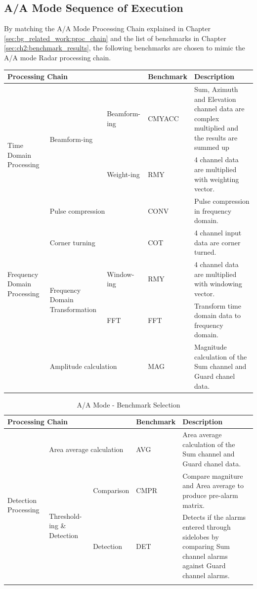 \subsection{A/A Mode Sequence of Execution}
By matching the A/A Mode Processing Chain explained in Chapter \ref{sec:bg_related_work:proc_chain} and the list of benchmarks in Chapter \ref{sec:ch2:benchmark_results}, the following benchmarks are chosen to mimic the A/A mode Radar processing chain.

\begin{longtable}{|p{1.6cm}|p{1.9cm}|p{1.7cm}|p{1.9cm}|p{6cm}|} 
	 \hline
	\multicolumn{3}{|l|}{\textbf{Processing Chain}} & \textbf{Benchmark} & \textbf{Description} \\ \hline
	 \multirow{3}{*}{\parbox{1.7cm}{Time Domain Processing}} & \multirow{2}{*}{\parbox{1.5cm}{Beamform-ing}} & Beamform-ing & CMYACC & Sum, Azimuth and Elevation channel data are complex multiplied and the results are summed up \\ \cline{3-5}
	 & & Weight-ing & RMY & 4 channel data are multiplied with weighting vector. \\ \cline{2-5}
	& \multicolumn{2}{|l|}{Pulse compression} & CONV & Pulse compression in frequency domain. \\ \hline
	
	\multirow{3}{*}{\parbox{1.7cm}{Frequency Domain Processing}} & \multicolumn{2}{|l|}{Corner turning} & COT & 4 channel input data are corner turned. \\ \cline{2-5}
	& \multirow{2}{*}{\parbox{1.7cm}{Frequency Domain Transformation}} & Window-ing & RMY & 4 channel data are multiplied with windowing vector. \\ \cline{3-5}
	& & FFT & FFT & Transform time domain data to frequency domain. \\ \cline{2-5}
	& \multicolumn{2}{|l|}{Amplitude calculation} & MAG & Magnitude calculation of the Sum channel and Guard chanel data. \\ \hline
\end{longtable}
\clearpage
\begin{longtable}{|p{1.6cm}|p{1.9cm}|p{1.7cm}|p{1.9cm}|p{6cm}|} 
	 \hline
	\multicolumn{3}{|l|}{\textbf{Processing Chain}} & \textbf{Benchmark} & \textbf{Description} \\ \hline
	\multirow{3}{*}{\parbox{1.7cm}{Detection Processing}} & \multicolumn{2}{|l|}{Area average calculation} & AVG & Area average calculation of the  Sum channel and Guard chanel data. \\ \cline{2-5}
	& \multirow{2}{*}{\parbox{1.7cm}{Threshold-ing \& Detection}} & Comparison & CMPR & Compare magniture and Area average to produce pre-alarm matrix. \\ \cline{2-5}
	& & Detection & DET & Detects if the alarms entered through sidelobes by comparing Sum channel alarms against Guard channel alarms. \\ \hline
	\caption{A/A Mode - Benchmark Selection}
	\label{tbl:mm:aa_seq_exe}
\end{longtable}

